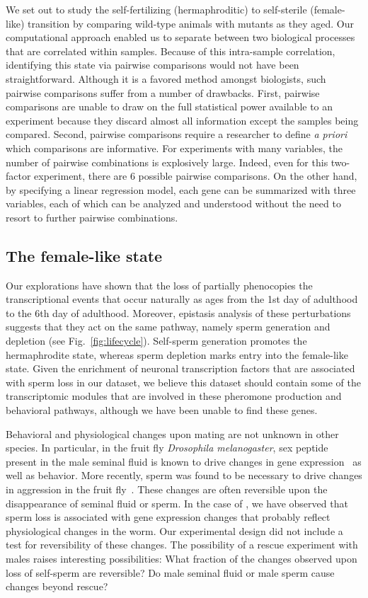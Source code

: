 We set out to study the self-fertilizing (hermaphroditic) to self-sterile
(female-like) transition by comparing wild-type animals with \fog{} mutants as
they aged. Our computational approach enabled us to separate between two
biological processes that are correlated within samples. Because of this
intra-sample correlation, identifying this state via pairwise comparisons would
not have been straightforward. Although it is a favored method amongst
biologists, such pairwise comparisons suffer from a number of drawbacks. First,
pairwise comparisons are unable to draw on the full statistical power available
to an experiment because they discard almost all information except the samples
being compared. Second, pairwise comparisons require a researcher to define
\emph{a priori} which comparisons are informative. For experiments with many
variables, the number of pairwise combinations is explosively large. Indeed,
even for this two-factor experiment, there are 6 possible pairwise comparisons.
On the other hand, by specifying a linear regression model, each gene can be
summarized with three variables, each of which can be analyzed and understood
without the need to resort to further pairwise combinations.

\subsection*{The \cel{} female-like state}
\label{sub:female_state}
Our explorations have shown that the loss of \fog{} partially phenocopies the
transcriptional events that occur naturally as \cel{} ages from the 1st day of
adulthood to the 6th day of adulthood. Moreover, epistasis analysis of these
perturbations suggests that they act on the same pathway, namely sperm generation
and depletion (see Fig.~\ref{fig:lifecycle}). Self-sperm generation promotes the
hermaphrodite state, whereas sperm depletion marks entry into the female-like
state. Given the enrichment of neuronal transcription factors that are
associated with sperm loss in our dataset, we believe this dataset should
contain some of the transcriptomic modules that are involved in these pheromone
production and behavioral pathways, although we have been unable to find these
genes.

Behavioral and physiological changes upon mating are not unknown in other
species. In particular, in the fruit fly \emph{Drosophila melanogaster}, sex
peptide present in the male seminal fluid is known to drive changes in gene
expression~\citep{Liu2003,Xue2000,Avila2011,Heifetz2014,Rezaval2014,Mack2006} as
well as behavior. More recently, sperm was found to be necessary to drive
changes in aggression in the fruit fly~\citep{Bath2017}. These changes are often
reversible upon the disappearance of seminal fluid or sperm. In the case of
\cel{}, we have observed that sperm loss is associated with gene expression
changes that probably reflect physiological changes in the worm. Our
experimental design did not include a test for reversibility of these changes.
The possibility of a rescue experiment with males raises interesting
possibilities: What fraction of the changes observed upon loss of self-sperm are
reversible? Do male seminal fluid or male sperm cause changes beyond rescue?

